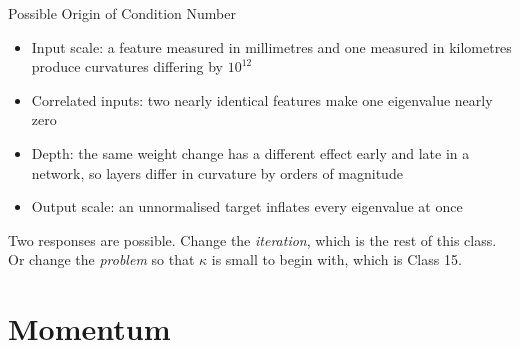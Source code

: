 \documentclass[aspectratio=169, 11pt]{beamer}
\newcommand{\nosrc}{}       %
\begin{document}
\begin{frame}{Possible Origin of Condition Number}
  \nosrc
  \vspace{0.1em}
  \begin{itemize}\itemsep0.3em
    \item \alert{Input scale}: a feature measured in millimetres and one
          measured in kilometres produce curvatures differing by $10^{12}$
    \item \alert{Correlated inputs}: two nearly identical features make
          one eigenvalue nearly zero
    \item \alert{Depth}: the same weight change has a different effect
          early and late in a network, so layers differ in curvature by
          orders of magnitude
    \item \alert{Output scale}: an unnormalised target inflates every
          eigenvalue at once
  \end{itemize}
  \vspace{0.25em}
  \begin{redhighlight}
    Two responses are possible. Change the \emph{iteration}, which is the rest of
    this class. Or change the \emph{problem} so that $\kappa$ is small to
    begin with, which is Class 15.
  \end{redhighlight}
\end{frame}

\section{Momentum}
\end{document}
